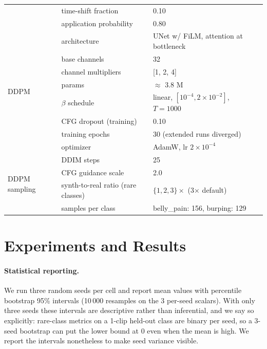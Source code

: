 \documentclass[final]{article}
\begin{document}
\begin{table}[!ht]
\begin{tabular}{lll}
                             & time-shift fraction & 0.10 \\
                             & application probability & 0.80 \\
\midrule
\multirow{8}{*}{DDPM} & architecture & UNet w/ FiLM, attention at bottleneck \\
                      & base channels & 32 \\
                      & channel multipliers & [1, 2, 4] \\
                      & params & $\approx$ 3.8 M \\
                      & $\beta$ schedule & linear, $[10^{-4}, 2\times10^{-2}]$, $T=1000$ \\
                      & CFG dropout (training) & 0.10 \\
                      & training epochs & 30 (extended runs diverged) \\
                      & optimizer & AdamW, lr $2\times10^{-4}$ \\
\midrule
\multirow{4}{*}{DDPM sampling} & DDIM steps & 25 \\
                               & CFG guidance scale & 2.0 \\
                               & synth-to-real ratio (rare classes) & $\{1,2,3\}\times$ (3$\times$ default) \\
                               & samples per class & belly\_pain: 156, burping: 129 \\
\bottomrule
\end{tabular}
\end{table}

\section{Experiments and Results}\label{sec:expts}

\paragraph{Statistical reporting.} We run three random seeds per cell and report mean values with percentile bootstrap 95\% intervals \cite{efron1986bootstrap} (10\,000 resamples on the 3 per-seed scalars). With only three seeds these intervals are descriptive rather than inferential, and we say so explicitly: rare-class metrics on a 1-clip held-out class are binary per seed, so a 3-seed bootstrap can put the lower bound at 0 even when the mean is high. We report the intervals nonetheless to make seed variance visible.
\end{document}
